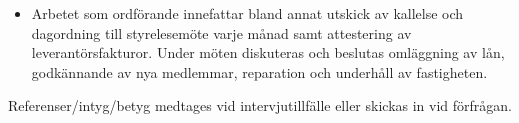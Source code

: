 \documentclass[10pt,a4paper,ragged2e]{altacv}
\begin{document}
\begin{fullwidth}
\divider

\begin{itemize}
  \item Arbetet som ordförande innefattar bland annat utskick av kallelse och dagordning till 
  styrelesemöte varje månad samt attestering av leverantörsfakturor. Under möten diskuteras och 
  beslutas omläggning av lån, godkännande av nya medlemmar, reparation och underhåll av fastigheten. 
\end{itemize}


\divider


\divider


\divider


Referenser/intyg/betyg medtages vid intervjutillfälle eller skickas in vid förfrågan.

\end{fullwidth}
\end{document}

